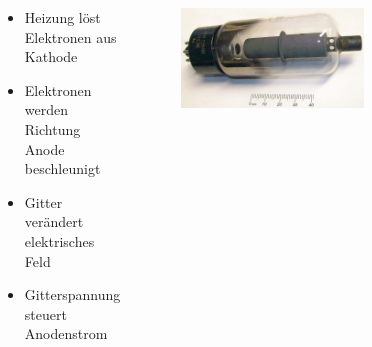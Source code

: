 \begin{frame}
\begin{columns}
\begin{figure}
    \end{figure}
    \begin{small}
      \begin{itemize}
        \item Heizung löst Elektronen aus Kathode
        \item Elektronen werden Richtung Anode beschleunigt
        \item Gitter verändert elektrisches Feld
        \item Gitterspannung steuert Anodenstrom
      \end{itemize}
    \end{small}
    \begin{center}
      \begin{figure}
        \includegraphics[scale=0.4 ]{a06/Triode.jpg}
      \end{figure}
    \end{center}
  \end{columns}
\end{frame}


